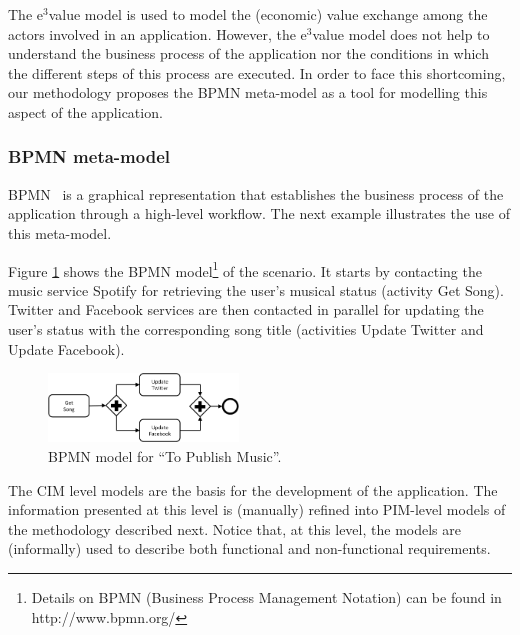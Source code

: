 The e$^3$value  model is used to model the (economic) value exchange among the actors involved in an application. 
However, the e$^3$val\-ue model does not help to understand the business process of the application nor the conditions in which the different steps of this process are executed. 
In order to face this shortcoming, our methodology proposes the BPMN meta-model as a tool for modelling this aspect of the application.



\subsubsection{BPMN meta-model}

BPMN~\cite{BPMN}  is a graphical representation that establishes the business process of the application through a high-level workflow. 
The next example illustrates the use of this meta-model.

\begin{example}\label{ex:toPublicMusicBPMN}
Figure \ref{fig:CIM:tpmbpmn} shows the BPMN model\footnote{Details on BPMN (Business Process Management Notation) can be found in http://www.bpmn.org/} of the scenario. 
It starts by contacting the music service Spotify for retrieving the user's  musical status (activity {\sf Get Song}). 
Twitter and Facebook services are then contacted in parallel for updating the user's status with the corresponding song title (activities {\sf Update Twitter} and {\sf Update Facebook}).
\end{example}
%
\begin{figure}
\center
\includegraphics[width=0.45\textwidth]{figs/SC.pdf}
\caption{\label{fig:CIM:tpmbpmn} BPMN model for ``To Publish Music''.}
\end{figure}

The CIM level models are the basis for the development of the application. 
The information presented at this level is (manually) refined into PIM-level models of the methodology \pisodm described next.
Notice that, at this level, the models are (informally) used to describe both functional and non-functional requirements.

